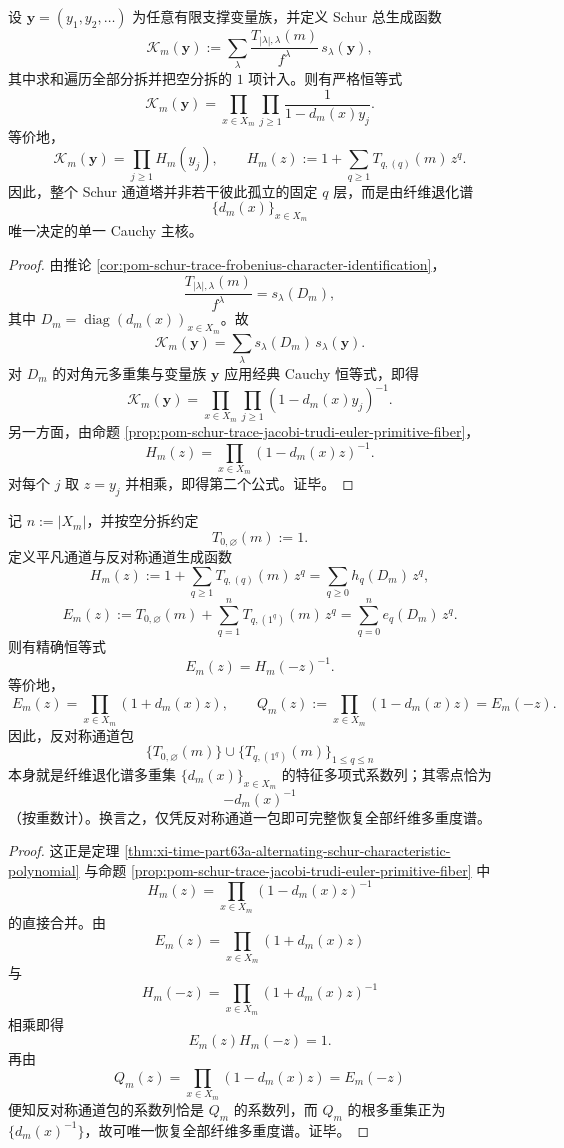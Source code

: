 \begin{theorem}\label{thm:xi-time-part63c-schur-cauchy-master-kernel}
设 \(\mathbf y=(y_1,y_2,\dots)\) 为任意有限支撑变量族，并定义 Schur 总生成函数
\[
\mathcal K_m(\mathbf y)
:=
\sum_{\lambda}
\frac{T_{|\lambda|,\lambda}(m)}{f^\lambda}\,
s_\lambda(\mathbf y),
\]
其中求和遍历全部分拆并把空分拆的 \(1\) 项计入。则有严格恒等式
\[
\boxed{\;
\mathcal K_m(\mathbf y)
=
\prod_{x\in X_m}\prod_{j\ge 1}\frac{1}{1-d_m(x)y_j}.\;}
\]
等价地，
\[
\boxed{\;
\mathcal K_m(\mathbf y)
=
\prod_{j\ge 1}H_m(y_j),\qquad
H_m(z):=1+\sum_{q\ge 1}T_{q,(q)}(m)\,z^q.\;}
\]
因此，整个 Schur 通道塔并非若干彼此孤立的固定 \(q\) 层，而是由纤维退化谱
\[
\{d_m(x)\}_{x\in X_m}
\]
唯一决定的单一 Cauchy 主核。
\end{theorem}
\begin{proof}
由推论 \ref{cor:pom-schur-trace-frobenius-character-identification}，
\[
\frac{T_{|\lambda|,\lambda}(m)}{f^\lambda}=s_\lambda(D_m),
\]
其中 \(D_m=\operatorname{diag}(d_m(x))_{x\in X_m}\)。故
\[
\mathcal K_m(\mathbf y)
=
\sum_{\lambda}s_\lambda(D_m)\,s_\lambda(\mathbf y).
\]
对 \(D_m\) 的对角元多重集与变量族 \(\mathbf y\) 应用经典 Cauchy 恒等式，即得
\[
\mathcal K_m(\mathbf y)
=
\prod_{x\in X_m}\prod_{j\ge 1}(1-d_m(x)y_j)^{-1}.
\]
另一方面，由命题 \ref{prop:pom-schur-trace-jacobi-trudi-euler-primitive-fiber}，
\[
H_m(z)=\prod_{x\in X_m}(1-d_m(x)z)^{-1}.
\]
对每个 \(j\) 取 \(z=y_j\) 并相乘，即得第二个公式。证毕。
\end{proof}

\begin{theorem}[平凡通道与反对称通道之间的严格符号倒数对偶]\label{thm:xi-time-part63c-trivial-alternating-sign-reciprocal-duality}
记 \(n:=|X_m|\)，并按空分拆约定
\[
T_{0,\varnothing}(m):=1.
\]
定义平凡通道与反对称通道生成函数
\[
H_m(z):=1+\sum_{q\ge 1}T_{q,(q)}(m)\,z^q
=
\sum_{q\ge 0}h_q(D_m)\,z^q,
\]
\[
E_m(z):=T_{0,\varnothing}(m)+\sum_{q=1}^{n}T_{q,(1^q)}(m)\,z^q
=
\sum_{q=0}^{n}e_q(D_m)\,z^q.
\]
则有精确恒等式
\[
\boxed{\;
E_m(z)=H_m(-z)^{-1}.\;}
\]
等价地，
\[
\boxed{\;
E_m(z)=\prod_{x\in X_m}(1+d_m(x)z),\qquad
Q_m(z):=\prod_{x\in X_m}(1-d_m(x)z)=E_m(-z).\;}
\]
因此，反对称通道包
\[
\{T_{0,\varnothing}(m)\}\cup\{T_{q,(1^q)}(m)\}_{1\le q\le n}
\]
本身就是纤维退化谱多重集 \(\{d_m(x)\}_{x\in X_m}\) 的特征多项式系数列；其零点恰为
\[
-d_m(x)^{-1}
\]
（按重数计）。换言之，仅凭反对称通道一包即可完整恢复全部纤维多重度谱。
\end{theorem}
\begin{proof}
这正是定理 \ref{thm:xi-time-part63a-alternating-schur-characteristic-polynomial} 与命题
\ref{prop:pom-schur-trace-jacobi-trudi-euler-primitive-fiber}
中
\[
H_m(z)=\prod_{x\in X_m}(1-d_m(x)z)^{-1}
\]
的直接合并。由
\[
E_m(z)=\prod_{x\in X_m}(1+d_m(x)z)
\]
与
\[
H_m(-z)=\prod_{x\in X_m}(1+d_m(x)z)^{-1}
\]
相乘即得
\[
E_m(z)H_m(-z)=1.
\]
再由
\[
Q_m(z)=\prod_{x\in X_m}(1-d_m(x)z)=E_m(-z)
\]
便知反对称通道包的系数列恰是 \(Q_m\) 的系数列，而 \(Q_m\) 的根多重集正为 \(\{d_m(x)^{-1}\}\)，故可唯一恢复全部纤维多重度谱。证毕。
\end{proof}

